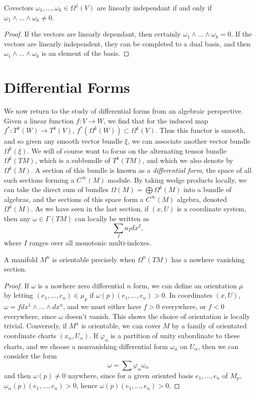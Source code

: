\begin{corollary}
    Covectors $\omega_1, \dots, \omega_k \in \Omega^1(V)$ are linearly independant if and only if $\omega_1 \wedge \dots \wedge \omega_k \neq 0$.
\end{corollary}
\begin{proof}
    If the vectors are linearly dependant, then certainly $\omega_1 \wedge \dots \wedge \omega_k = 0$. If the vectors are linearly independent, they can be completed to a dual basis, and then $\omega_1 \wedge \dots \wedge \omega_k$ is an element of the basis.
\end{proof}

\section{Differential Forms}

We now return to the study of differential forms from an algebraic perspective. Given a linear function $f: V \to W$, we find that for the induced map $f^*: T^k(W) \to T^k(V)$, $f^*(\Omega^k(W)) \subset \Omega^k(V)$. Thus this functor is smooth, and so given any smooth vector bundle $\xi$, we can associate another vector bundle $\Omega^k(\xi)$. We will of course want to focus on the alternating tensor bundle $\Omega^k(TM)$, which is a subbundle of $T^k(TM)$, and which we also denote by $\Omega^k(M)$. A section of this bundle is known as a \emph{differential form}, the space of all such sections forming a $C^\infty(M)$ module. By taking wedge products locally, we can take the direct sum of bundles $\Omega(M) = \bigoplus \Omega^k(M)$ into a bundle of algebras, and the sections of this space form a $C^\infty(M)$ algebra, denoted $\Omega^k(M)$. As we have seen in the last section, if $(x,U)$ is a coordinate system, then any $\omega \in \Gamma(TM)$ can locally be written as
%
\[ \sum_I a_I dx^I, \]
%
where $I$ ranges over all monotonic multi-indexes.

\begin{theorem}
    A manifold $M^n$ is orientable precisely when $\Omega^n(TM)$ has a nowhere vanishing section.
\end{theorem}
\begin{proof}
    If $\omega$ is a nowhere zero differential $n$ form, we can define an orientation $\mu$ by letting $(e_1, \dots, e_n) \in \mu_p$ if $\omega(p)(e_1, \dots, e_n) > 0$. In coordinates $(x,U)$, $\omega = f dx^1 \wedge \dots \wedge dx^n$, and we must either have $f > 0$ everywhere, or $f < 0$ everywhere, since $\omega$ doesn't vanish. This shows the choice of orientation is locally trivial. Conversely, if $M^n$ is orientable, we can cover $M$ by a family of orientated coordinate charts $(x_\alpha, U_\alpha)$. If $\varphi_\alpha$ is a partition of unity subordinate to these charts, and we choose a nonvanishing differential form $\omega_\alpha$ on $U_\alpha$, then we can consider the form
    \[ \omega = \sum \varphi_\alpha \omega_\alpha \]
    and then $\omega(p) \neq 0$ naywhere, since for a given oriented basis $e_1, \dots, e_n$ of $M_p$, $\omega_\alpha(p)(e_1, \dots, e_n) > 0$, hence $\omega(p)(e_1, \dots, e_n) > 0$.
\end{proof}

